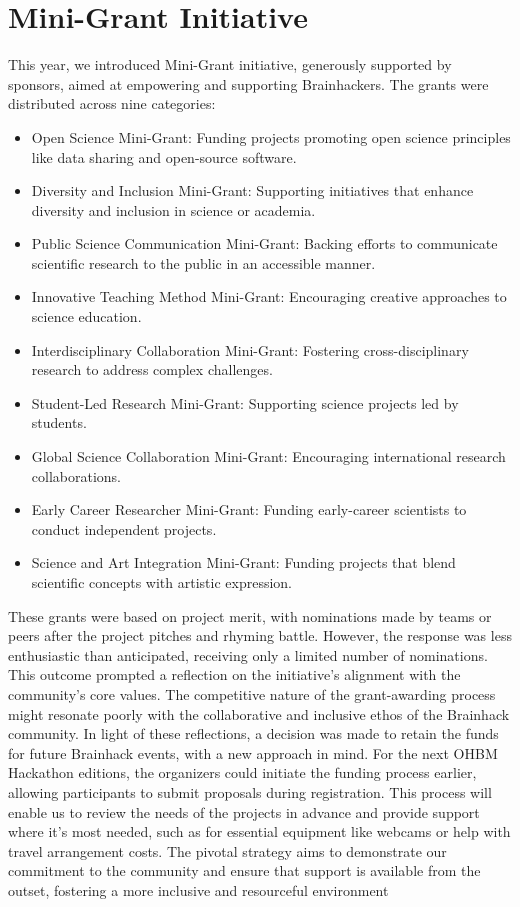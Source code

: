 \documentclass{article}
\begin{document}
\section{Mini-Grant Initiative}

This year, we introduced Mini-Grant initiative, generously supported by sponsors, aimed at empowering and supporting Brainhackers. The grants were distributed across nine categories:
\begin{itemize}
\item Open Science Mini-Grant: Funding projects promoting open science principles like data sharing and open-source software.
\item Diversity and Inclusion Mini-Grant: Supporting initiatives that enhance diversity and inclusion in science or academia.
\item Public Science Communication Mini-Grant: Backing efforts to communicate scientific research to the public in an accessible manner.
\item Innovative Teaching Method Mini-Grant: Encouraging creative approaches to science education.
\item Interdisciplinary Collaboration Mini-Grant: Fostering cross-disciplinary research to address complex challenges.
\item Student-Led Research Mini-Grant: Supporting science projects led by students.
\item Global Science Collaboration Mini-Grant: Encouraging international research collaborations.
\item Early Career Researcher Mini-Grant: Funding early-career scientists to conduct independent projects.
\item Science and Art Integration Mini-Grant: Funding projects that blend scientific concepts with artistic expression.
\end{itemize}

These grants were based on project merit, with nominations made by teams or peers after the project pitches and rhyming battle.
However, the response was less enthusiastic than anticipated, receiving only a limited number of nominations.
This outcome prompted a reflection on the initiative's alignment with the community's core values.
The competitive nature of the grant-awarding process might resonate poorly with the collaborative and inclusive ethos of the Brainhack community.
In light of these reflections, a decision was made to retain the funds for future Brainhack events, with a new approach in mind.
For the next OHBM Hackathon editions, the organizers could initiate the funding process earlier, allowing participants to submit proposals during registration.
This process will enable us to review the needs of the projects in advance and provide support where it's most needed, such as for essential equipment like webcams or help with travel arrangement costs.
The pivotal strategy aims to demonstrate our commitment to the community and ensure that support is available from the outset, fostering a more inclusive and resourceful environment
\end{document}
